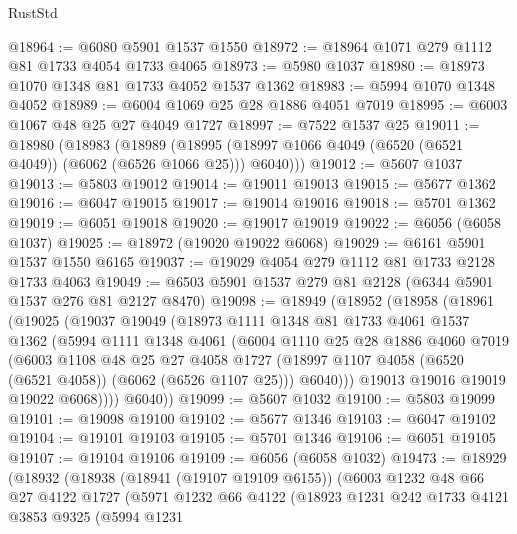 \begin{lexlean}{RustStd}
\begin{coremodule}
@18964 := @6080 @5901 @1537 @1550
@18972 := @18964 @1071 @279 @1112 @81 @1733 @4054 @1733 @4065
@18973 := @5980 @1037
@18980 := @18973 @1070 @1348 @81 @1733 @4052 @1537 @1362
@18983 := @5994 @1070 @1348 @4052
@18989 := @6004 @1069 @25 @28 @1886 @4051 @7019
@18995 := @6003 @1067 @48 @25 @27 @4049 @1727
@18997 := @7522 @1537 @25
@19011 := @18980
    (@18983
      (@18989 (@18995 (@18997 @1066 @4049 (@6520 (@6521 @4049)) (@6062 (@6526 @1066 @25))) @6040)))
@19012 := @5607 @1037
@19013 := @5803 @19012
@19014 := @19011 @19013
@19015 := @5677 @1362
@19016 := @6047 @19015
@19017 := @19014 @19016
@19018 := @5701 @1362
@19019 := @6051 @19018
@19020 := @19017 @19019
@19022 := @6056 (@6058 @1037)
@19025 := @18972 (@19020 @19022 @6068)
@19029 := @6161 @5901 @1537 @1550 @6165
@19037 := @19029 @4054 @279 @1112 @81 @1733 @2128 @1733 @4063
@19049 := @6503 @5901 @1537 @279 @81 @2128 (@6344 @5901 @1537 @276 @81 @2127 @8470)
@19098 := @18949
    (@18952
      (@18958
        (@18961
          (@19025
            (@19037
              @19049
              (@18973
                @1111
                @1348
                @81
                @1733
                @4061
                @1537
                @1362
                (@5994
                  @1111
                  @1348
                  @4061
                  (@6004
                    @1110
                    @25
                    @28
                    @1886
                    @4060
                    @7019
                    (@6003
                      @1108
                      @48
                      @25
                      @27
                      @4058
                      @1727
                      (@18997 @1107 @4058 (@6520 (@6521 @4058)) (@6062 (@6526 @1107 @25)))
                      @6040)))
                @19013
                @19016
                @19019
                @19022
                @6068))))
        @6040))
@19099 := @5607 @1032
@19100 := @5803 @19099
@19101 := @19098 @19100
@19102 := @5677 @1346
@19103 := @6047 @19102
@19104 := @19101 @19103
@19105 := @5701 @1346
@19106 := @6051 @19105
@19107 := @19104 @19106
@19109 := @6056 (@6058 @1032)
@19473 := @18929
    (@18932
      (@18938
        (@18941 (@19107 @19109 @6155))
        (@6003
          @1232
          @48
          @66
          @27
          @4122
          @1727
          (@5971
            @1232
            @66
            @4122
            (@18923
              @1231
              @242
              @1733
              @4121
              @3853
              @9325
              (@5994
                @1231

\end{coremodule}
\end{lexlean}
